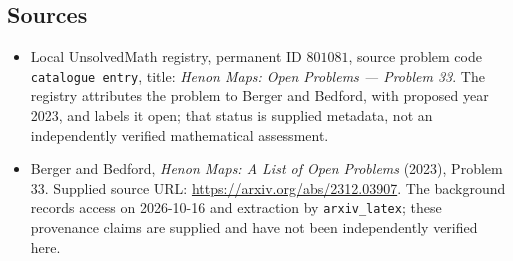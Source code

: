 \documentclass[11pt]{article}
\begin{document}
\subsection{Sources}
\begin{itemize}
\item Local UnsolvedMath registry, permanent ID \(801081\), source problem code \texttt{catalogue entry}, title: \emph{Henon Maps: Open Problems --- Problem 33}. The registry attributes the problem to Berger and Bedford, with proposed year 2023, and labels it open; that status is supplied metadata, not an independently verified mathematical assessment.
\item Berger and Bedford, \emph{Henon Maps: A List of Open Problems} (2023), Problem 33. Supplied source URL: \url{https://arxiv.org/abs/2312.03907}. The background records access on 2026-10-16 and extraction by \texttt{arxiv\_latex}; these provenance claims are supplied and have not been independently verified here.
\end{itemize}
\end{document}
